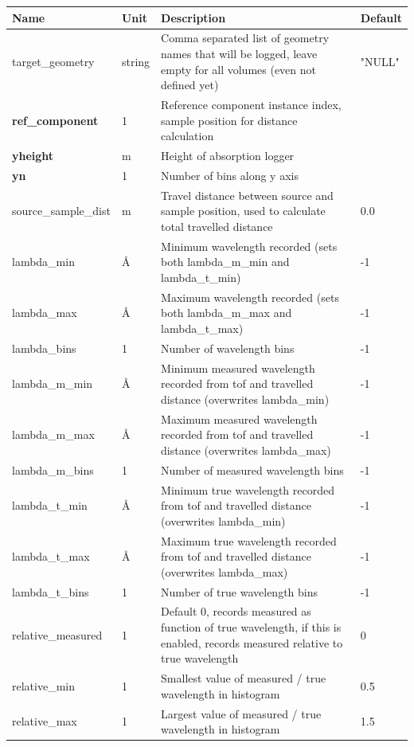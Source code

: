 \begin{longtable}{p{}p{}p{}p{}}
\toprule
\textbf{Name} & \textbf{Unit} & \textbf{Description} & \textbf{Default} \\
\midrule
\endhead
target\_geometry & string & Comma separated list of geometry names that will be logged, leave empty for all volumes (even not defined yet) & "NULL" \\
\textbf{ref\_component} & 1 & Reference component instance index, sample position for distance calculation &  \\
\textbf{yheight} & m & Height of absorption logger &  \\
\textbf{yn} & 1 & Number of bins along y axis &  \\
source\_sample\_dist & m & Travel distance between source and sample position, used to calculate total travelled distance & 0.0 \\
lambda\_min & \AA{} & Minimum wavelength recorded (sets both lambda\_m\_min and lambda\_t\_min) & -1 \\
lambda\_max & \AA{} & Maximum wavelength recorded (sets both lambda\_m\_max and lambda\_t\_max) & -1 \\
lambda\_bins & 1 & Number of wavelength bins & -1 \\
lambda\_m\_min & \AA{} & Minimum measured wavelength recorded from tof and travelled distance (overwrites lambda\_min) & -1 \\
lambda\_m\_max & \AA{} & Maximum measured wavelength recorded from tof and travelled distance (overwrites lambda\_max) & -1 \\
lambda\_m\_bins & 1 & Number of measured wavelength bins & -1 \\
lambda\_t\_min & \AA{} & Minimum true wavelength recorded from tof and travelled distance (overwrites lambda\_min) & -1 \\
lambda\_t\_max & \AA{} & Maximum true wavelength recorded from tof and travelled distance (overwrites lambda\_max) & -1 \\
lambda\_t\_bins & 1 & Number of true wavelength bins & -1 \\
relative\_measured & 1 & Default 0, records measured as function of true wavelength, if this is enabled, records measured relative to true wavelength & 0 \\
relative\_min & 1 & Smallest value of measured / true wavelength in histogram & 0.5 \\
relative\_max & 1 & Largest value of measured / true wavelength in histogram & 1.5 \\

\end{longtable}
